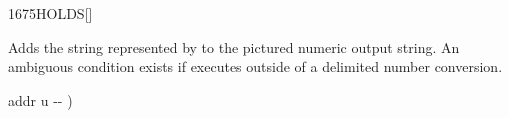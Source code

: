 
\begin{worddef}{1675}{HOLDS}[]%
\item {}

	Adds the string represented by  to the pictured numeric
	output string.  An ambiguous condition exists if  executes
	outside of a   delimited number conversion.


	\begin{implement} %
	\word{:}   addr u -{}- ) \\
	\tab[0.6]      \word{+}
	    \word{;}
	\end{implement}

	\begin{testing} %
	\end{testing}
\end{worddef}


